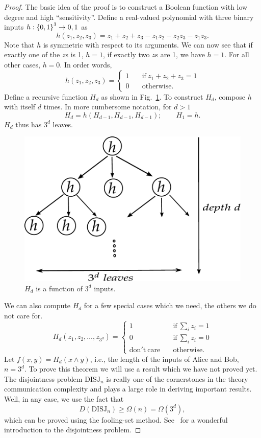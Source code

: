 \documentclass[letterpaper]{article}
\providecommand\cbrac[1]{\ensuremath \left\{#1\right\}}
\providecommand{\aand}{\wedge}
\newcommand{\DISJ}{\mathrm{DISJ}}
\begin{document}
\begin{proof}
The basic idea of the proof is to construct a Boolean function with low degree and high ``sensitivity''. Define a real-valued polynomial with three binary inputs $h : \cbrac{0,1}^3 \to {0,1}$ as
$$
h(z_1, z_2, z_3) = z_1 + z_2 + z_3 - z_1 z_2 - z_2 z_3 - z_1 z_3.
$$
Note that $h$ is symmetric with respect to its arguments. We can now see that if exactly one of the $z$s is 1, $h = 1$, if exactly two $z$s are 1, we have $h = 1$. For all other cases, $h = 0$. In order words,
$$
h(z_1, z_2, z_3) = 
\begin{cases}
1 & \quad \mathrm{if}\ z_1 + z_2 + z_3 = 1\\
0 & \quad \mathrm{otherwise}.
\end{cases}
$$
Define a recursive function $H_d$ as shown in Fig.~\ref{fig:H_d}. To construct $H_d$, compose $h$ with itself $d$ times. In more cumbersome notation, for $d > 1$
$$
H_d = h(H_{d-1}, H_{d-1}, H_{d-1}); \qquad H_1 = h.
$$
$H_d$ thus has $3^d$ leaves.

\begin{figure}
\centering
\includegraphics[width=0.5 \textwidth]{H_d.pdf}
\caption{$H_d$ is a function of $3^d$ inputs.}
\label{fig:H_d}
\end{figure}

We can also compute $H_d$ for a few special cases which we need, the others we do not care for.
$$
H_d(z_1, z_2, \ldots, z_{3^d}) =
\begin{cases}
1 & \quad \mathrm{if}\ \sum_{i} z_i = 1\\
0 & \quad \mathrm{if}\ \sum_{i} z_i = 0\\
\mathrm{don't\ care} & \quad \mathrm{otherwise}.
\end{cases}
$$
Let $f(x,y) = H_d(x \aand y)$, i.e., the length of the inputs of Alice and Bob, $n = 3^d$. To prove this theorem we will use a result which we have not proved yet. The disjointness problem $\DISJ_n$ is really one of the cornerstones in the theory communication complexity and plays a large role in deriving important results. Well, in any case, we use the fact that
$$
D(\DISJ_n) \geq \Omega(n) = \Omega(3^d),
$$
which can be proved using the fooling-set method. See~\cite{chattopadhyay2010story} for a wonderful introduction to the disjointness problem.


\end{proof}
\end{document}
